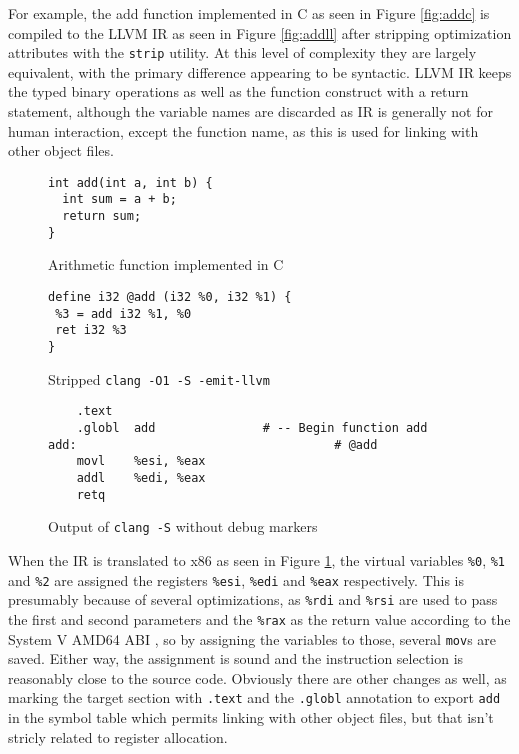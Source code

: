 \documentclass{article}
\begin{document}
For example, the add function implemented in C as seen in Figure \ref{fig:addc} is compiled to the LLVM IR as seen in Figure \ref{fig:addll} after stripping optimization attributes with the \texttt{strip} utility. At this level of complexity they are largely equivalent, with the primary difference appearing to be syntactic. LLVM IR keeps the typed binary operations as well as the function construct with a return statement, although the variable names are discarded as IR is generally not for human interaction, except the function name, as this is used for linking with other object files. 

\begin{figure}[!ht]
   \begin{minipage}{0.48\textwidth}
     \centering
     \begin{verbatim}
int add(int a, int b) {
  int sum = a + b;
  return sum;
}
     \end{verbatim}
     \caption{Arithmetic function implemented in C}\label{fig:addc}
   \end{minipage}\hfill
   \begin{minipage}{0.48\textwidth}
     \centering
     \begin{verbatim}
define i32 @add (i32 %0, i32 %1) {
 %3 = add i32 %1, %0
 ret i32 %3
}
     \end{verbatim}
     \caption{Stripped \texttt{clang -O1 -S -emit-llvm}}\label{fig:addll}
   \end{minipage}
   \begin{center}
   \begin{minipage}{0.83\textwidth}
     \centering
     \begin{verbatim}
	.text
	.globl	add               # -- Begin function add
add:                                    # @add
	movl	%esi, %eax
	addl	%edi, %eax
	retq
     \end{verbatim}
     \caption{Output of \texttt{clang -S} without debug markers}\label{fig:addx86}
   \end{minipage}
   \end{center}
\end{figure}
When the IR is translated to x86 as seen in Figure \ref{fig:addx86}, the virtual variables \texttt{\%0}, \texttt{\%1} and \texttt{\%2} are assigned the registers \texttt{\%esi}, \texttt{\%edi} and \texttt{\%eax} respectively. This is presumably because of several optimizations, as \texttt{\%rdi} and \texttt{\%rsi} are used to pass the first and second parameters and the \texttt{\%rax} as the return value according to the System V AMD64 ABI \cite{sysv}, so by assigning the variables to those, several \texttt{mov}s are saved. Either way, the assignment is sound and the instruction selection is reasonably close to the  source code. Obviously there are other changes as well, as marking the target section with \texttt{.text} and the \texttt{.globl} annotation to export \texttt{add} in the symbol table which permits linking with other object files, but that isn't stricly related to register allocation.
\end{document}
